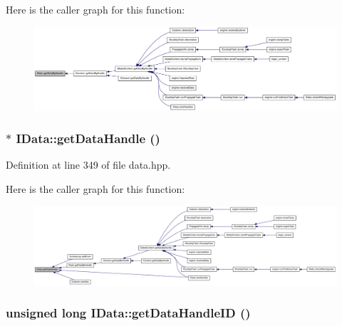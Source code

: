Here is the caller graph for this function:\nopagebreak
\begin{figure}[H]
\begin{center}
\leavevmode
\includegraphics[width=420pt]{class_i_data_a78a571407788130ebe382f51c3774605_icgraph}
\end{center}
\end{figure}
\hypertarget{class_i_data_a07c124c61dac722dded4c78d45be5cd2}{
\subsubsection[{getDataHandle}]{$\ast$ IData::getDataHandle ()}}
\label{class_i_data_a07c124c61dac722dded4c78d45be5cd2}


Definition at line 349 of file data.hpp.

Here is the caller graph for this function:\nopagebreak
\begin{figure}[H]
\begin{center}
\leavevmode
\includegraphics[width=420pt]{class_i_data_a07c124c61dac722dded4c78d45be5cd2_icgraph}
\end{center}
\end{figure}
\hypertarget{class_i_data_af0448989fa9d551acfb8ead2523a32e5}{
\subsubsection[{getDataHandleID}]{\setlength{\rightskip}{0pt plus 5cm}unsigned long IData::getDataHandleID ()}}
\label{class_i_data_af0448989fa9d551acfb8ead2523a32e5}


